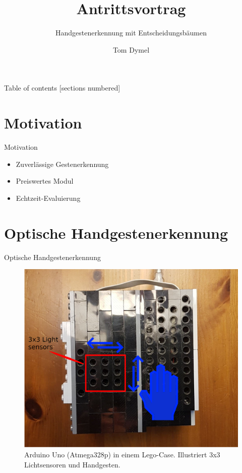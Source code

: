 \documentclass[10pt]{beamer}
\title{Antrittsvortrag}
\subtitle{Handgestenerkennung mit Entscheidungsbäumen}
\date{}
\author{Tom Dymel}
\institute{Technische Universität Hamburg}
\begin{document}
\maketitle

\begin{frame}{Table of contents}
  [sections numbered]
  \tableofcontents[hideallsubsections]
\end{frame}

\section{Motivation}
\begin{frame}{Motivation}
\begin{itemize}
    \item Zuverlässige Gestenerkennung
    \item Preiswertes Modul
    \item Echtzeit-Evaluierung 
\end{itemize}
\end{frame}

\section{Optische Handgestenerkennung}
\begin{frame}{Optische Handgestenerkennung}
\begin{figure}
    \includegraphics[width=0.77\linewidth]{aufgabe.png}
    \caption{Arduino Uno (Atmega328p) in einem Lego-Case. Illustriert 3x3 Lichtsensoren und Handgesten.}
  \end{figure}
\end{frame}
\end{document}
